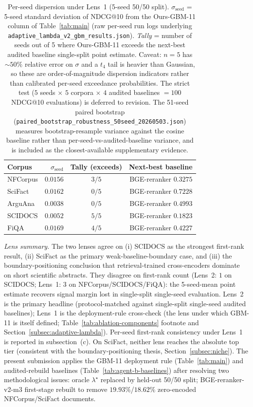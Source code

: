 \documentclass[review,1p]{elsarticle}
\begin{document}
\begin{table}[ht]
\centering
\caption{Per-seed dispersion under Lens~1 (5-seed 50/50 split). $\sigma_{\mathrm{seed}}$ = 5-seed standard deviation of NDCG@10 from the Ours-GBM-11 column of Table~\ref{tab:main} (raw per-seed run logs underlying \texttt{adaptive\_lambda\_v2\_gbm\_results.json}). \emph{Tally} = number of seeds out of 5 where Ours-GBM-11 exceeds the next-best audited baseline single-split point estimate. Caveat: $n=5$ has ${\sim}50\%$ relative error on $\sigma$ and a $t_4$ tail is heavier than Gaussian, so these are order-of-magnitude dispersion indicators rather than calibrated per-seed exceedance probabilities. The strict test ($5$ seeds $\times$ $5$ corpora $\times$ $4$ audited baselines $= 100$ NDCG@10 evaluations) is deferred to revision. The 51-seed paired bootstrap (\texttt{paired\_bootstrap\_robustness\_50seed\_20260503.json}) measures bootstrap-resample variance against the cosine baseline rather than per-seed-vs-audited-baseline variance, and is included as the closest-available supplementary evidence.}
\label{tab:per-seed-dispersion}
\footnotesize
\begin{tabular}{lrcr}
\toprule
Corpus & $\sigma_{\mathrm{seed}}$ & Tally (exceeds) & Next-best baseline \\
\midrule
NFCorpus & $0.0156$ & $3/5$ & BGE-reranker $0.3275$ \\
SciFact & $0.0162$ & $0/5$ & BGE-reranker $0.7228$ \\
ArguAna & $0.0038$ & $0/5$ & BGE-reranker $0.4993$ \\
SCIDOCS & $0.0052$ & $5/5$ & BGE-reranker $0.1823$ \\
FiQA & $0.0169$ & $4/5$ & BGE-reranker $0.4227$ \\
\bottomrule
\end{tabular}
\end{table}

\textit{Lens summary.} The two lenses agree on (i) SCIDOCS as the strongest first-rank result, (ii) SciFact as the primary weak-baseline-boundary case, and (iii) the boundary-positioning conclusion that retrieval-trained cross-encoders dominate on short scientific abstracts. They disagree on first-rank count (Lens~2: $1$ on SCIDOCS; Lens~1: $3$ on NFCorpus/SCIDOCS/FiQA): the 5-seed-mean point estimate recovers signal margin lost in single-split single-seed evaluation. Lens~2 is the primary headline (protocol-matched against single-split single-seed audited baselines); Lens~1 is the deployment-rule cross-check (the lens under which GBM-11 is itself defined; Table~\ref{tab:ablation-components} footnote and Section~\ref{subsec:adaptive-lambda}). Per-seed first-rank consistency under Lens~1 is reported in subsection~(c). On SciFact, neither lens reaches the absolute top tier (consistent with the boundary-positioning thesis, Section~\ref{subsec:niche}). The present submission applies the GBM-11 deployment rule (Table~\ref{tab:main}) and audited-rebuild baselines (Table~\ref{tab:agent-b-baselines}) after resolving two methodological issues: oracle $\lambda^\star$ replaced by held-out 50/50 split; BGE-reranker-v2-m3 first-stage rebuilt to remove $19.93\%$/$18.62\%$ zero-encoded NFCorpus/SciFact documents.
\end{document}
